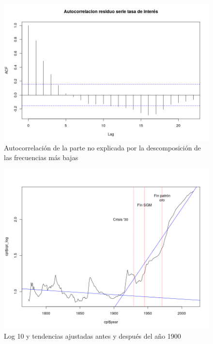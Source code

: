 \documentclass[a4paper]{article}
\begin{document}
\begin{figure}[H]
	\centering
	\includegraphics[width=0.8\linewidth]{ir_resid_acf.png}
	\caption{Autocorrelación de la parte no explicada por la descomposición de las frecuencias más bajas} 	
	\label{fig:ir_resid_acf}
\end{figure}

\begin{figure}[H]
	\centering
	\includegraphics[width=0.8\linewidth]{cpi_log10_tend.png}
	\caption{Log 10 y tendencias ajustadas antes y después del año 1900} 	
	\label{fig:cpi_log10_tend}
\end{figure}
\end{document}
